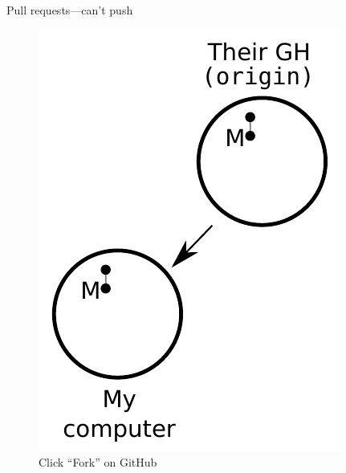 \begin{frame}{Pull requests---can't push}
  \begin{figure}
    \includegraphics{fork_002.pdf}
    \\ Click ``Fork'' on GitHub
    \\ \texttt{}
  \end{figure}
\end{frame}

